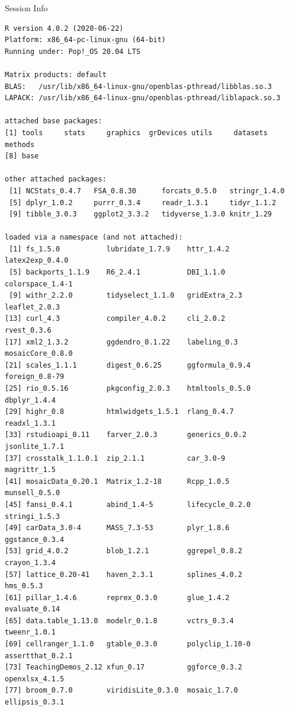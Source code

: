 \documentclass[10pt]{beamer}\usepackage[]{graphicx}\usepackage[]{color}
\makeatletter
\newenvironment{kframe}{%
 \def\at@end@of@kframe{}%
 \ifinner\ifhmode%
  \def\at@end@of@kframe{\end{minipage}}%
  \begin{minipage}{\columnwidth}%
 \fi\fi%
 \def\FrameCommand##1{\hskip\@totalleftmargin \hskip-\fboxsep
 \colorbox{shadecolor}{##1}\hskip-\fboxsep
     \hskip-\linewidth \hskip-\@totalleftmargin \hskip\columnwidth}%
 \MakeFramed {\advance\hsize-\width
   \@totalleftmargin\z@ \linewidth\hsize
   \@setminipage}}%
 {\par\unskip\endMakeFramed%
 \at@end@of@kframe}
\newenvironment{knitrout}{}{} %
\makeatother
\begin{document}


\begin{frame}[fragile]{Session Info}
	\tiny
	
\begin{knitrout}\tiny
{}\color{fgcolor}\begin{kframe}
\begin{verbatim}
R version 4.0.2 (2020-06-22)
Platform: x86_64-pc-linux-gnu (64-bit)
Running under: Pop!_OS 20.04 LTS

Matrix products: default
BLAS:   /usr/lib/x86_64-linux-gnu/openblas-pthread/libblas.so.3
LAPACK: /usr/lib/x86_64-linux-gnu/openblas-pthread/liblapack.so.3

attached base packages:
[1] tools     stats     graphics  grDevices utils     datasets  methods  
[8] base     

other attached packages:
 [1] NCStats_0.4.7   FSA_0.8.30      forcats_0.5.0   stringr_1.4.0  
 [5] dplyr_1.0.2     purrr_0.3.4     readr_1.3.1     tidyr_1.1.2    
 [9] tibble_3.0.3    ggplot2_3.3.2   tidyverse_1.3.0 knitr_1.29     

loaded via a namespace (and not attached):
 [1] fs_1.5.0           lubridate_1.7.9    httr_1.4.2         latex2exp_0.4.0   
 [5] backports_1.1.9    R6_2.4.1           DBI_1.1.0          colorspace_1.4-1  
 [9] withr_2.2.0        tidyselect_1.1.0   gridExtra_2.3      leaflet_2.0.3     
[13] curl_4.3           compiler_4.0.2     cli_2.0.2          rvest_0.3.6       
[17] xml2_1.3.2         ggdendro_0.1.22    labeling_0.3       mosaicCore_0.8.0  
[21] scales_1.1.1       digest_0.6.25      ggformula_0.9.4    foreign_0.8-79    
[25] rio_0.5.16         pkgconfig_2.0.3    htmltools_0.5.0    dbplyr_1.4.4      
[29] highr_0.8          htmlwidgets_1.5.1  rlang_0.4.7        readxl_1.3.1      
[33] rstudioapi_0.11    farver_2.0.3       generics_0.0.2     jsonlite_1.7.1    
[37] crosstalk_1.1.0.1  zip_2.1.1          car_3.0-9          magrittr_1.5      
[41] mosaicData_0.20.1  Matrix_1.2-18      Rcpp_1.0.5         munsell_0.5.0     
[45] fansi_0.4.1        abind_1.4-5        lifecycle_0.2.0    stringi_1.5.3     
[49] carData_3.0-4      MASS_7.3-53        plyr_1.8.6         ggstance_0.3.4    
[53] grid_4.0.2         blob_1.2.1         ggrepel_0.8.2      crayon_1.3.4      
[57] lattice_0.20-41    haven_2.3.1        splines_4.0.2      hms_0.5.3         
[61] pillar_1.4.6       reprex_0.3.0       glue_1.4.2         evaluate_0.14     
[65] data.table_1.13.0  modelr_0.1.8       vctrs_0.3.4        tweenr_1.0.1      
[69] cellranger_1.1.0   gtable_0.3.0       polyclip_1.10-0    assertthat_0.2.1  
[73] TeachingDemos_2.12 xfun_0.17          ggforce_0.3.2      openxlsx_4.1.5    
[77] broom_0.7.0        viridisLite_0.3.0  mosaic_1.7.0       ellipsis_0.3.1    
\end{verbatim}
\end{kframe}
\end{knitrout}
	
\end{frame}
\end{document}
